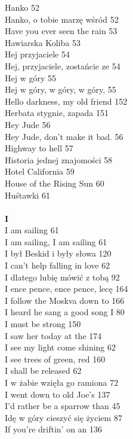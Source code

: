 \documentclass[a5paper, 10pt]{book}
\begin{document}
{\begin{multicols}{3}
    Hanko 52\\
    Hanko, o tobie marzę wśród 52\\
    Have you ever seen the rain 53\\
    Hawiarska Koliba 53\\
    Hej przyjaciele 54\\
    Hej, przyjaciele, zostańcie ze 54\\
    Hej w góry 55\\
    Hej w góry, w góry, w góry, 55\\
    Hello darkness, my old friend 152\\
    Herbata stygnie, zapada 151\\
    Hey Jude 56\\
    Hey Jude, don't make it bad. 56\\
    Highway to hell 57\\
    Historia jednej znajomości 58\\
    Hotel California 59\\
    House of the Rising Sun 60\\
    Huśtawki 61\\
    \\
    {\footnotesize \textbf{I\\} }
    I am sailing 61\\
    I am sailing, I am sailing 61\\
    I był Beskid i były słowa 120\\
    I can't help falling in love 62\\
    I dlatego lubię mówić z tobą 92\\
    I ence pence, ence pence, lecę 164\\
    I follow the Moskva down to 166\\
    I heard he sang a good song I 80\\
    I must be strong 150\\
    I saw her today at the 174\\
    I see my light come shining 62\\
    I see trees of green, red 160\\
    I shall be released 62\\
    I w żabie wzięła go ramiona 72\\
    I went down to old Joe's 137\\
    I'd rather be a sparrow than 45\\
    Idę w góry cieszyć się życiem 87\\
    If you're driftin' on an 136\\

\end{multicols}}
\end{document}
